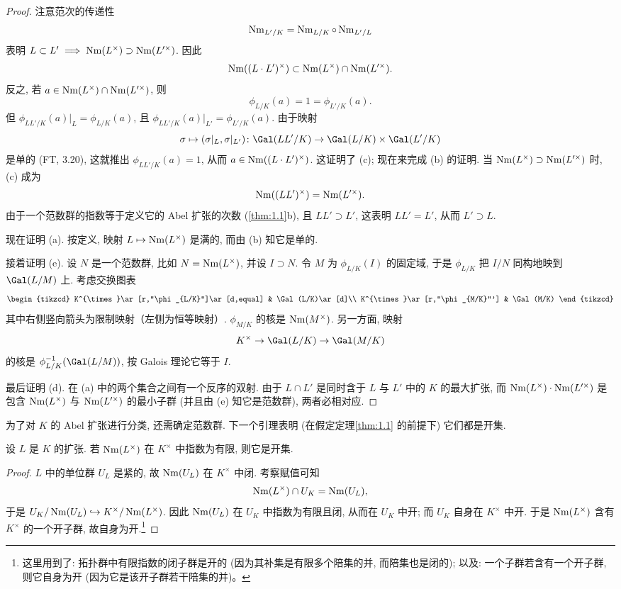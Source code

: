 \begin{proof}
注意范次的传递性
\[
\operatorname{Nm}_{L'/K}=\operatorname{Nm}_{L/K}\circ\operatorname{Nm}_{L'/L}
\]
表明 $L\subset L'\implies \operatorname{Nm}(L^{\times})\supset\operatorname{Nm}(L'^{\times})$. 因此
\[
\operatorname{Nm}((L\cdot L')^{\times})\subset\operatorname{Nm}(L^{\times})\cap\operatorname{Nm}(L'^{\times}).
\]
反之, 若 $a\in\operatorname{Nm}(L^{\times})\cap\operatorname{Nm}(L'^{\times})$, 则
\[
\phi_{L/K}(a)=1=\phi_{L'/K}(a).
\]
但 $\phi_{LL'/K}(a)|_L=\phi_{L/K}(a)$, 且 $\phi_{LL'/K}(a)|_{L'}=\phi_{L'/K}(a)$. 由于映射
\[
\sigma\mapsto(\sigma|_L,\sigma|_{L'})\colon\Gal(LL'/K)\to\Gal(L/K)\times\Gal(L'/K)
\]
是单的 (FT, 3.20), 这就推出 $\phi_{LL'/K}(a)=1$, 从而 $a\in\operatorname{Nm}((L\cdot L')^{\times})$. 这证明了 (c); 现在来完成 (b) 的证明. 当 $\operatorname{Nm}(L^{\times})\supset\operatorname{Nm}(L'^{\times})$ 时, (c) 成为
\[
\operatorname{Nm}((LL')^{\times})=\operatorname{Nm}(L'^{\times}).
\]
由于一个范数群的指数等于定义它的 Abel 扩张的次数 (\ref{thm:1.1}b), 且 $LL'\supset L'$, 这表明 $LL'=L'$, 从而 $L'\supset L$.

现在证明 (a). 按定义, 映射 $L\mapsto\operatorname{Nm}(L^{\times})$ 是满的, 而由 (b) 知它是单的.

接着证明 (e). 设 $N$ 是一个范数群, 比如 $N=\operatorname{Nm}(L^{\times})$, 并设 $I\supset N$. 令 $M$ 为 $\phi_{L/K}(I)$ 的固定域, 于是 $\phi_{L/K}$ 把 $I/N$ 同构地映到 $\Gal(L/M)$ 上. 考虑交换图表
\[
\begin{tikzcd}
K^{\times}\ar[r,"\phi_{L/K}"]\ar[d,equal] & \Gal(L/K)\ar[d]\\
K^{\times}\ar[r,"\phi_{M/K}"'] & \Gal(M/K)
\end{tikzcd}
\]
其中右侧竖向箭头为限制映射（左侧为恒等映射）. $\phi_{M/K}$ 的核是 $\operatorname{Nm}(M^{\times})$. 另一方面, 映射
\[
K^{\times}\to\Gal(L/K)\to\Gal(M/K)
\]
的核是 $\phi_{L/K}^{-1}(\Gal(L/M))$, 按 Galois 理论它等于 $I$.

最后证明 (d). 在 (a) 中的两个集合之间有一个反序的双射. 由于 $L\cap L'$ 是同时含于 $L$ 与 $L'$ 中的 $K$ 的最大扩张, 而 $\operatorname{Nm}(L^{\times})\cdot\operatorname{Nm}(L'^{\times})$ 是包含 $\operatorname{Nm}(L^{\times})$ 与 $\operatorname{Nm}(L'^{\times})$ 的最小子群 (并且由 (e) 知它是范数群), 两者必相对应.
\end{proof}

为了对 $K$ 的 Abel 扩张进行分类, 还需确定范数群. 下一个引理表明 (在假定定理\ref{thm:1.1} 的前提下) 它们都是开集.

\begin{lemma}\label{lem:1.3}
设 $L$ 是 $K$ 的扩张. 若 $\operatorname{Nm}(L^{\times})$ 在 $K^{\times}$ 中指数为有限, 则它是开集.
\end{lemma}

\begin{proof}
$L$ 中的单位群 $U_L$ 是紧的, 故 $\operatorname{Nm}(U_L)$ 在 $K^{\times}$ 中闭. 考察赋值可知
\[
\operatorname{Nm}(L^{\times})\cap U_K=\operatorname{Nm}(U_L),
\]
于是 $U_K/\operatorname{Nm}(U_L)\hookrightarrow K^{\times}/\operatorname{Nm}(L^{\times})$. 因此 $\operatorname{Nm}(U_L)$ 在 $U_K$ 中指数为有限且闭, 从而在 $U_K$ 中开; 而 $U_K$ 自身在 $K^{\times}$ 中开. 于是 $\operatorname{Nm}(L^{\times})$ 含有 $K^{\times}$ 的一个开子群, 故自身为开.\footnote{这里用到了: 拓扑群中有限指数的闭子群是开的 (因为其补集是有限多个陪集的并, 而陪集也是闭的); 以及: 一个子群若含有一个开子群, 则它自身为开 (因为它是该开子群若干陪集的并)。}
\end{proof}


